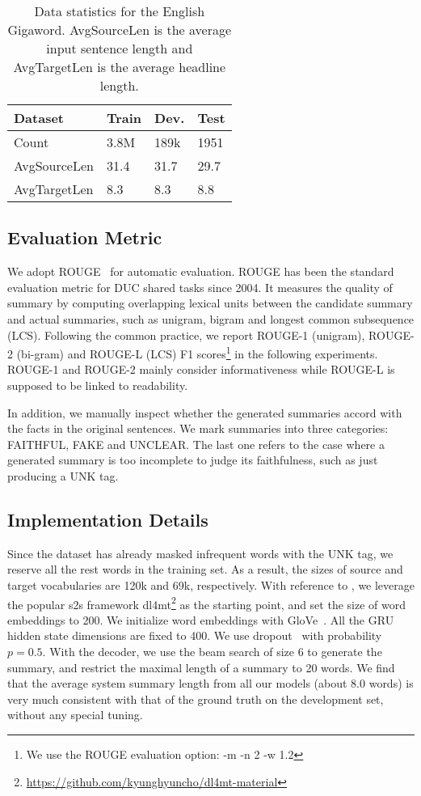 \documentclass[letterpaper]{article} \usepackage{aaai18}  \usepackage{times}  \usepackage{helvet}  \usepackage{courier}  \usepackage{url}  \usepackage{graphicx}  \usepackage{amsfonts}
\begin{document}
	\begin{table}[]
		\centering
		\begin{tabular}{l|lll}
			\hline
			Dataset      & Train & Dev. & Test \\ \hline
			Count        & 3.8M  & 189k & 1951 \\
			AvgSourceLen & 31.4  & 31.7 & 29.7     \\
			AvgTargetLen & 8.3   & 8.3  & 8.8     \\ \hline
		\end{tabular}
		\caption{Data statistics for the English Gigaword. AvgSourceLen is the average input sentence length and AvgTargetLen is the average headline length.}
		\label{tb:dataset}
	\end{table}
	
	
	\subsection{Evaluation Metric}
	We adopt ROUGE~\cite{lin2004rouge} for automatic evaluation.
	ROUGE has been the standard evaluation metric for DUC shared tasks since 2004. 
	It measures the quality of summary by computing overlapping lexical units between the candidate summary and actual summaries, such as unigram, bigram and longest common subsequence (LCS). 
	Following the common practice, we report ROUGE-1 (unigram), ROUGE-2 (bi-gram) and ROUGE-L (LCS) F1 scores\footnote{We use the ROUGE evaluation option: -m -n 2 -w 1.2} in the following experiments.
	ROUGE-1 and ROUGE-2 mainly consider informativeness while ROUGE-L is supposed to be linked to readability.
	
	In addition, we manually inspect whether the generated summaries accord with the facts in the original sentences.
	We mark summaries into three categories: FAITHFUL, FAKE and UNCLEAR.
	The last one refers to the case where a generated summary is too incomplete to judge its faithfulness, such as just producing a UNK tag.
	
	\subsection{Implementation Details}
	Since the dataset has already masked infrequent words with the UNK tag, we reserve all the rest words in the training set.
	As a result, the sizes of source and target vocabularies are 120k and 69k, respectively. 
	With reference to \cite{nallapati2016abstractive}, we leverage the popular s2s framework dl4mt\footnote{\url{https://github.com/kyunghyuncho/dl4mt-material}} as the starting point, and set the size of word embeddings to 200.
	We initialize word embeddings with GloVe~\cite{pennington2014glove}.
	All the GRU hidden state dimensions are fixed to 400.
	We use dropout~\cite{srivastava2014dropout} with probability $p = 0.5$.
	With the decoder, we use the beam search of size 6 to generate the summary, and restrict the maximal length of a summary to 20 words.
	We find that the average system summary length from all our models (about 8.0 words) is very much consistent with that of the ground truth on the development set, without any special tuning. 
	
\end{document}
